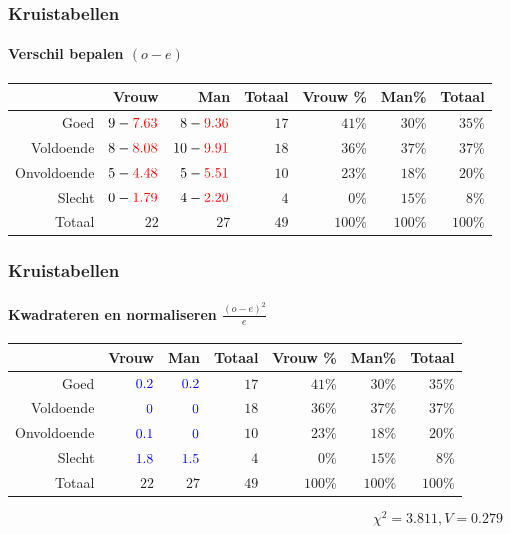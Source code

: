 \documentclass[aspectratio=169]{beamer}
\begin{document}
\begin{frame}
  \frametitle{Kruistabellen}
  \framesubtitle{Verschil bepalen $(o - e)$}
  
  \begin{adjustwidth}{-1.5em}{-1.5em}
    \begin{table}[h] \centering
      \begin{tabular}{@{}rrrrrrr@{}} \toprule
        & Vrouw & Man & Totaal & Vrouw \% & Man\%   & Totaal  \\ \midrule
        Goed        & $9 -\textcolor{red}{7.63}$     & $8 - \textcolor{red}{9.36}$   & $17$     & $41$\%  & $30$\% & $35$\% \\
        Voldoende   & $8 - \textcolor{red}{8.08}$   & $10 - \textcolor{red}{9.91}$  & $18$     & $36$\%  & $37$\%    & $37$\% \\
        Onvoldoende & $5 - \textcolor{red}{4.48}$    & $5 - \textcolor{red}{5.51}$  & $10$     & $23$\%  & $18$\% & $20$\% \\
        Slecht      & $0 - \textcolor{red}{1.79}$    & $4 - \textcolor{red}{2.20}$  & $4$      & $0$\%      & $15$\% & $8$\%  \\
        Totaal      & $22$    & $27$  & $49$     & $100$\%    & $100$\%   & $100$\%   \\
        \bottomrule
      \end{tabular}
    \end{table}
  \end{adjustwidth}
\end{frame}

\begin{frame}
  \frametitle{Kruistabellen}
  \framesubtitle{Kwadrateren en normaliseren $\frac{(o-e)^2}{e}$}
  
  \begin{table}[h] \centering
    \begin{tabular}{@{}rrrrrrr@{}} \toprule
      & Vrouw                   & Man                     & Totaal & Vrouw \% & Man\%   & Totaal  \\
      \midrule
      Goed        & $\textcolor{blue}{0.2}$ & $\textcolor{blue}{0.2}$ & $17$   & $41$\%   & $30$\%  & $35$\% \\
      Voldoende   & $\textcolor{blue}{0}$   & $\textcolor{blue}{0}$   & $18$   & $36$\%   & $37$\%  & $37$\% \\
      Onvoldoende & $\textcolor{blue}{0.1}$ & $\textcolor{blue}{0}$   & $10$   & $23$\%   & $18$\%  & $20$\% \\
      Slecht      & $\textcolor{blue}{1.8}$ & $\textcolor{blue}{1.5}$ & $4$    & $0$\%    & $15$\%  & $8$\%  \\
      Totaal      & $22$                    & $27$                    & $49$   & $100$\%  & $100$\% & $100$\%   \\
      \bottomrule
    \end{tabular}
  \end{table}
  \[ \chi^{2} = 3.811, V= 0.279 \]
\end{frame}
\end{document}
